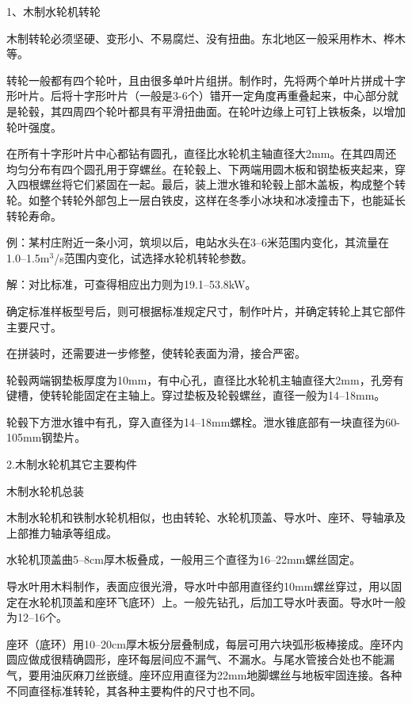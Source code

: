 \documentclass{ctexbook}
\begin{document}
1、木制水轮机转轮

木制转轮必须坚硬、变形小、不易腐烂、没有扭曲。东北地区一般采用柞木、桦木等。

转轮一般都有四个轮叶，且由很多单叶片组拼。制作时，先将两个单叶片拼成十字形叶片。后将十字形叶片（一般是3-6个）错开一定角度再重叠起来，中心部分就是轮毂，其四周四个轮叶都具有平滑扭曲面。在轮叶边缘上可钉上铁板条，以增加轮叶强度。

在所有十字形叶片中心都钻有圆孔，直径比水轮机主轴直径大2mm。在其四周还均匀分布有四个圆孔用于穿螺丝。在轮毂上、下两端用圆木板和钢垫板夹起来，穿入四根螺丝将它们紧固在一起。最后，装上泄水锥和轮毂上部木盖板，构成整个转轮。如整个转轮外部包上一层白铁皮，这样在冬季小冰块和冰凌撞击下，也能延长转轮寿命。

例：某村庄附近一条小河，筑坝以后，电站水头在3--6米范围内变化，其流量在1.0--1.5m$^3$/s范围内变化，试选择水轮机转轮参数。

解：对比标准，可查得相应出力则为19.1--53.8kW。

确定标准样板型号后，则可根据标准规定尺寸，制作叶片，并确定转轮上其它部件主要尺寸。

在拼装时，还需要进一步修整，使转轮表面为滑，接合严密。

轮毂两端钢垫板厚度为10mm，有中心孔，直径比水轮机主轴直径大2mm，孔旁有键槽，使转轮能固定在主轴上。穿过垫板及轮毂螺丝，直径一般为14--18mm。

轮毂下方泄水锥中有孔，穿入直径为14--18mm螺栓。泄水锥底部有一块直径为60-105mm钢垫片。

2.木制水轮机其它主要构件

木制水轮机总装

木制水轮机和铁制水轮机相似，也由转轮、水轮机顶盖、导水叶、座环、导轴承及上部推力轴承等组成。

水轮机顶盖曲5--8cm厚木板叠成，一般用三个直径为16--22mm螺丝固定。

导水叶用木料制作，表面应很光滑，导水叶中部用直径约10mm螺丝穿过，用以固定在水轮机顶盖和座环飞底环）上。一般先钻孔，后加工导水叶表面。导水叶一般为12--16个。

座环（底环）用10--20cm厚木板分层叠制成，每层可用六块弧形板棒接成。座环内圆应做成很精确圆形，座环每层间应不漏气、不漏水。与尾水管接合处也不能漏气，要用油灰麻刀丝嵌缝。座环应用直径为22mm地脚螺丝与地板牢固连接。各种不同直径标准转轮，其各种主要构件的尺寸也不同。
\end{document}

